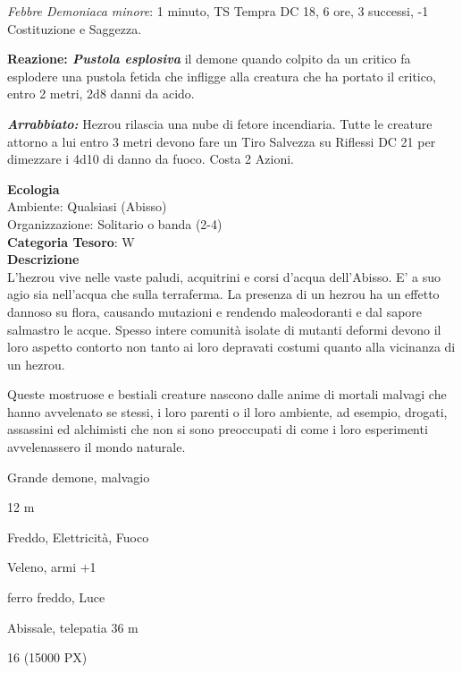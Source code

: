 \begin{multicols}{2}
{\emph{Febbre Demoniaca minore}: 1 minuto, TS Tempra DC 18, 6 ore, 3 successi, -1 Costituzione e Saggezza.

\textbf{Reazione: \emph{Pustola esplosiva}} il demone quando colpito da un critico fa esplodere una pustola fetida che infligge alla creatura che ha portato il critico, entro 2 metri, 2d8 danni da acido.

\emph{\textbf{Arrabbiato:}} Hezrou rilascia una nube di fetore incendiaria. Tutte le creature attorno a lui entro 3 metri devono fare un Tiro Salvezza su Riflessi DC 21 per dimezzare i 4d10 di danno da fuoco. Costa 2 Azioni.

\textbf{Ecologia}\\
Ambiente: Qualsiasi (Abisso)\\
Organizzazione: Solitario o banda (2-4)\\
\textbf{Categoria Tesoro}: W\\
\textbf{Descrizione}\\
L'hezrou vive nelle vaste paludi, acquitrini e corsi d'acqua dell'Abisso. E' a suo agio sia nell'acqua che sulla terraferma. La presenza di un hezrou ha un effetto dannoso su flora, causando mutazioni e rendendo maleodoranti e dal sapore salmastro le acque. Spesso intere comunità isolate di mutanti deformi devono il loro aspetto contorto non tanto ai loro depravati costumi quanto alla vicinanza di un hezrou.

Queste mostruose e bestiali creature nascono dalle anime di mortali malvagi che hanno avvelenato se stessi, i loro parenti o il loro ambiente, ad esempio, drogati, assassini ed alchimisti che non si sono preoccupati di come i loro esperimenti avvelenassero il mondo naturale.

\begin{description}[noitemsep, topsep=0pt, parsep=0pt, partopsep=0pt, itemsep=1pt, leftmargin=2.35cm,  labelwidth=2.2cm, itemindent=0cm, listparindent=0pt] %
\setlength{\baselineskip}{10pt}
\item[\textbf{Taglia/Tipo}] Grande demone, malvagio
\item[\textbf{Caratt.}] 
\item[\textbf{Punti Ferita}] 
\item[\textbf{Movimento}] 12 m
\item[\textbf{Tiri Salvez.}] 
\item[\textbf{Res. Danni}] Freddo, Elettricità, Fuoco
\item[\textbf{Imm. Danni}] Veleno, armi +1
\item[\textbf{Vulnerabilità}] ferro freddo, Luce
\item[\textbf{Sensi}] 
\item[\textbf{Linguaggi}] Abissale, telepatia 36 m
\item[\textbf{Sfida}] 16 (15000 PX)
\end{description}
\smallskip

}
\end{multicols}
